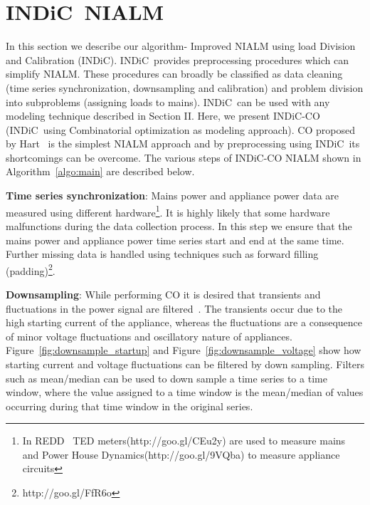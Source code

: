\documentclass[conference]{IEEEtran}
\newcommand{\figref}[1]{Figure~\ref{#1}}
\newcommand{\algoref}[1]{Algorithm~\ref{#1}}
\newcommand{\indic}{INDiC~}
\newcommand{\indicns}{INDiC}
\begin{document}

\section{\indic NIALM}
\noindent In this section we describe our algorithm- Improved NIALM using load Division and Calibration (\indicns). \indic provides preprocessing procedures which can simplify NIALM. These procedures can broadly be classified as data cleaning (time series synchronization, downsampling and calibration) and problem division into subproblems (assigning loads to mains). \indic can be used with any modeling technique described in Section II. Here, we present \indicns-CO (\indic using Combinatorial optimization as modeling approach). CO proposed by Hart~\cite{hart} is the simplest NIALM approach and by preprocessing using \indic its shortcomings can be overcome. The various steps of \indicns-CO NIALM shown in \algoref{algo:main} are described below. 

\noindent\textbf{Time series synchronization}: Mains power and appliance power data are measured using different hardware\footnote{In REDD~\cite{redd} TED meters(http://goo.gl/CEu2y) are used to measure mains and Power House Dynamics(http://goo.gl/9VQba) to measure appliance circuits}. It is highly likely that some hardware malfunctions during the data collection process. In this step we ensure that the mains power and appliance power time series start and end at the same time. Further missing data is handled using techniques such as forward filling (padding)\footnote{http://goo.gl/FfR6o}.

\noindent\textbf{Downsampling}: While performing CO it is desired that transients and fluctuations in the power signal are filtered~\cite{hart}. The transients occur due to the high starting current of the appliance, whereas the fluctuations are a consequence of minor voltage fluctuations and oscillatory nature of appliances. \figref{fig:downsample_startup} and \figref{fig:downsample_voltage} show how starting current and voltage fluctuations can be filtered by down sampling. Filters such as mean/median can be used to down sample a time series to a time window, where the value assigned to a time window is the mean/median of values occurring during that time window in the original series.
\end{document}
